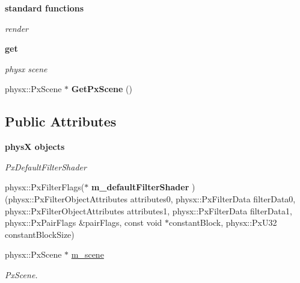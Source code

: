 \begin{Indent}{\bf standard functions}
\begin{DoxyCompactItemize}
\begin{DoxyCompactList}\small\item\em render \item\end{DoxyCompactList}\end{DoxyCompactItemize}
\end{Indent}
\begin{Indent}{\bf get}\par
{\em \label{_amgrpb5eda0a74558a342cf659187f06f746f}
 physx scene }\begin{DoxyCompactItemize}
\item 
\hypertarget{classContent_1_1Physics_1_1PhysicsScenePhysX_ab3e09168b0c62a366eb2c5a84c618b73}{
physx::PxScene $\ast$ {\bfseries GetPxScene} ()}
\label{classContent_1_1Physics_1_1PhysicsScenePhysX_ab3e09168b0c62a366eb2c5a84c618b73}

\end{DoxyCompactItemize}
\end{Indent}
\subsection*{Public Attributes}
\begin{Indent}{\bf physX objects}\par
{\em \label{_amgrp29dc2719356b85274d5e33d2a63db97d}
 PxDefaultFilterShader }\begin{DoxyCompactItemize}
\item 
\hypertarget{classContent_1_1Physics_1_1PhysicsScenePhysX_aea11049e3b7df4d88c50cb73a52b19de}{
physx::PxFilterFlags($\ast$ {\bfseries m\_\-defaultFilterShader} )(physx::PxFilterObjectAttributes attributes0, physx::PxFilterData filterData0, physx::PxFilterObjectAttributes attributes1, physx::PxFilterData filterData1, physx::PxPairFlags \&pairFlags, const void $\ast$constantBlock, physx::PxU32 constantBlockSize)}
\label{classContent_1_1Physics_1_1PhysicsScenePhysX_aea11049e3b7df4d88c50cb73a52b19de}

\item 
\hypertarget{classContent_1_1Physics_1_1PhysicsScenePhysX_a3ad52c2d6822a2ce7d3895ec57c1b31c}{
physx::PxScene $\ast$ \hyperlink{classContent_1_1Physics_1_1PhysicsScenePhysX_a3ad52c2d6822a2ce7d3895ec57c1b31c}{m\_\-scene}}
\label{classContent_1_1Physics_1_1PhysicsScenePhysX_a3ad52c2d6822a2ce7d3895ec57c1b31c}

\begin{DoxyCompactList}\small\item\em PxScene. \item\end{DoxyCompactList}\end{DoxyCompactItemize}
\end{Indent}


